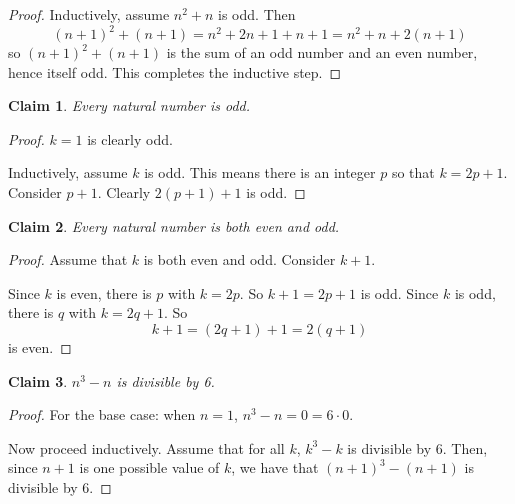 \documentclass[11pt]{letter}
\newtheorem{claim}{Claim}
\theoremstyle{definition}
\begin{document}
\begin{description}
\begin{enumerate}
\begin{proof}
					Inductively, assume $n^2+n$ is odd. Then
					$$(n+1)^2+(n+1)=n^2+2n+1+n+1=n^2+n+2(n+1)$$
					so $(n+1)^2+(n+1)$ is the sum of an odd number and an even number, hence itself odd. This completes the inductive step.
				\end{proof}
				
				\begin{claim}
					Every natural number is odd.
				\end{claim}
				\begin{proof}
					$k=1$ is clearly odd.
					
					Inductively, assume $k$ is odd. This means there is an integer $p$ so that $k=2p+1$. Consider $p+1$. Clearly $2(p+1)+1$ is odd.
				\end{proof}
				
				\begin{claim}
					Every natural number is both even and odd.
				\end{claim}
				\begin{proof}
					Assume that $k$ is both even and odd. Consider $k+1$.
					
					Since $k$ is even, there is $p$ with $k=2p$. So $k+1=2p+1$ is odd. Since $k$ is odd, there is $q$ with $k=2q+1$. So $$k+1=(2q+1)+1=2(q+1)$$is even.
				\end{proof}
				\begin{claim}
					$n^3-n$ is divisible by 6.
				\end{claim}
				\begin{proof}
					For the base case: when $n=1$, $n^3-n=0=6\cdot 0$.
					
					Now proceed inductively. Assume that for all $k$, $k^3-k$ is divisible by 6. Then, since $n+1$ is one possible value of $k$, we have that $(n+1)^3-(n+1)$ is divisible by 6. 
				\end{proof}


\end{enumerate}
\end{description}
\end{document}
